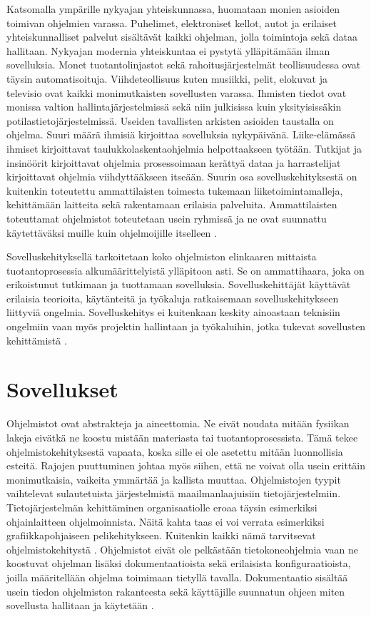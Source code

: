 \documentclass[utf8]{gradu3}
\begin{document}
Katsomalla ympärille nykyajan yhteiskunnassa, huomataan monien asioiden toimivan ohjelmien varassa. Puhelimet, elektroniset kellot, autot ja erilaiset yhteiskunnalliset palvelut sisältävät kaikki ohjelman, jolla toimintoja sekä dataa hallitaan. Nykyajan modernia yhteiskuntaa ei pystytä ylläpitämään ilman sovelluksia. Monet tuotantolinjastot sekä rahoitusjärjestelmät teollisuudessa ovat täysin automatisoituja. Viihdeteollisuus kuten musiikki, pelit, elokuvat ja televisio ovat kaikki monimutkaisten sovellusten varassa. Ihmisten tiedot ovat monissa valtion hallintajärjestelmissä sekä niin julkisissa kuin yksityisissäkin potilastietojärjestelmissä. Useiden tavallisten arkisten asioiden taustalla on ohjelma. Suuri määrä ihmisiä kirjoittaa sovelluksia nykypäivänä. Liike-elämässä ihmiset kirjoittavat taulukkolaskentaohjelmia helpottaakseen työtään. Tutkijat ja insinöörit kirjoittavat ohjelmia prosessoimaan kerättyä dataa ja harrastelijat kirjoittavat ohjelmia viihdyttääkseen itseään. Suurin osa sovelluskehityksestä on kuitenkin toteutettu ammattilaisten toimesta tukemaan liiketoimintamalleja, kehittämään laitteita sekä rakentamaan erilaisia palveluita. Ammattilaisten toteuttamat ohjelmistot toteutetaan usein ryhmissä ja ne ovat suunnattu käytettäväksi muille kuin ohjelmoijille itselleen \parencite[s.4]{Sommerville}.

Sovelluskehityksellä tarkoitetaan koko ohjelmiston elinkaaren mittaista tuotantoprosessia alkumäärittelyistä ylläpitoon asti. Se on ammattihaara, joka on erikoistunut tutkimaan ja tuottamaan sovelluksia. Sovelluskehittäjät käyttävät erilaisia teorioita, käytänteitä ja työkaluja ratkaisemaan sovelluskehitykseen liittyviä ongelmia. Sovelluskehitys ei kuitenkaan keskity ainoastaan teknisiin ongelmiin vaan myös projektin hallintaan ja työkaluihin, jotka tukevat sovellusten kehittämistä \parencite[s.1-10]{Sommerville}. 

\section{Sovellukset}
Ohjelmistot ovat abstrakteja ja aineettomia. Ne eivät noudata mitään fysiikan lakeja eivätkä ne koostu mistään materiasta tai tuotantoprosessista. Tämä tekee ohjelmistokehityksestä vapaata, koska sille ei ole asetettu mitään luonnollisia esteitä. Rajojen puuttuminen johtaa myös siihen, että ne voivat olla usein erittäin monimutkaisia, vaikeita ymmärtää ja kallista muuttaa. Ohjelmistojen tyypit vaihtelevat sulautetuista järjestelmistä maailmanlaajuisiin tietojärjestelmiin. Tietojärjestelmän kehittäminen organisaatiolle eroaa täysin esimerkiksi ohjainlaitteen ohjelmoinnista. Näitä kahta taas ei voi verrata esimerkiksi grafiikkapohjaiseen pelikehitykseen. Kuitenkin kaikki nämä tarvitsevat ohjelmistokehitystä \parencite[s.1-10]{Sommerville}. Ohjelmistot eivät ole pelkästään tietokoneohjelmia vaan ne koostuvat ohjelman lisäksi dokumentaatioista sekä erilaisista konfiguraatioista, joilla määritellään ohjelma toimimaan tietyllä tavalla. Dokumentaatio sisältää usein tiedon ohjelmiston rakanteesta sekä käyttäjille suunnatun ohjeen miten sovellusta hallitaan ja käytetään \parencite[s.1-10]{Sommerville}. 
\end{document}
